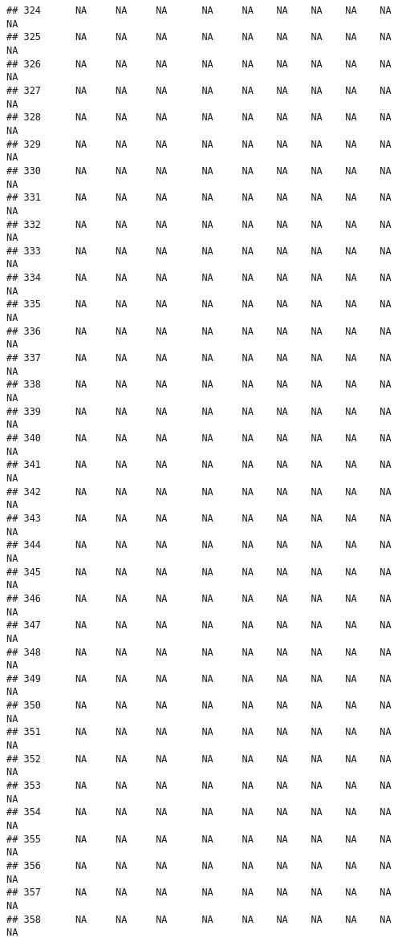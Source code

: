 \documentclass{article}\usepackage{graphicx, color}
\makeatletter
\newenvironment{kframe}{%
 \def\at@end@of@kframe{}%
 \ifinner\ifhmode%
  \def\at@end@of@kframe{\end{minipage}}%
  \begin{minipage}{\columnwidth}%
 \fi\fi%
 \def\FrameCommand##1{\hskip\@totalleftmargin \hskip-\fboxsep
 \colorbox{shadecolor}{##1}\hskip-\fboxsep
     \hskip-\linewidth \hskip-\@totalleftmargin \hskip\columnwidth}%
 \MakeFramed {\advance\hsize-\width
   \@totalleftmargin\z@ \linewidth\hsize
   \@setminipage}}%
 {\par\unskip\endMakeFramed%
 \at@end@of@kframe}
\newenvironment{knitrout}{}{} %
\makeatother
\begin{document}
\begin{knitrout}
\begin{kframe}
\begin{verbatim}
## 324      NA     NA     NA      NA     NA    NA    NA    NA    NA     NA
## 325      NA     NA     NA      NA     NA    NA    NA    NA    NA     NA
## 326      NA     NA     NA      NA     NA    NA    NA    NA    NA     NA
## 327      NA     NA     NA      NA     NA    NA    NA    NA    NA     NA
## 328      NA     NA     NA      NA     NA    NA    NA    NA    NA     NA
## 329      NA     NA     NA      NA     NA    NA    NA    NA    NA     NA
## 330      NA     NA     NA      NA     NA    NA    NA    NA    NA     NA
## 331      NA     NA     NA      NA     NA    NA    NA    NA    NA     NA
## 332      NA     NA     NA      NA     NA    NA    NA    NA    NA     NA
## 333      NA     NA     NA      NA     NA    NA    NA    NA    NA     NA
## 334      NA     NA     NA      NA     NA    NA    NA    NA    NA     NA
## 335      NA     NA     NA      NA     NA    NA    NA    NA    NA     NA
## 336      NA     NA     NA      NA     NA    NA    NA    NA    NA     NA
## 337      NA     NA     NA      NA     NA    NA    NA    NA    NA     NA
## 338      NA     NA     NA      NA     NA    NA    NA    NA    NA     NA
## 339      NA     NA     NA      NA     NA    NA    NA    NA    NA     NA
## 340      NA     NA     NA      NA     NA    NA    NA    NA    NA     NA
## 341      NA     NA     NA      NA     NA    NA    NA    NA    NA     NA
## 342      NA     NA     NA      NA     NA    NA    NA    NA    NA     NA
## 343      NA     NA     NA      NA     NA    NA    NA    NA    NA     NA
## 344      NA     NA     NA      NA     NA    NA    NA    NA    NA     NA
## 345      NA     NA     NA      NA     NA    NA    NA    NA    NA     NA
## 346      NA     NA     NA      NA     NA    NA    NA    NA    NA     NA
## 347      NA     NA     NA      NA     NA    NA    NA    NA    NA     NA
## 348      NA     NA     NA      NA     NA    NA    NA    NA    NA     NA
## 349      NA     NA     NA      NA     NA    NA    NA    NA    NA     NA
## 350      NA     NA     NA      NA     NA    NA    NA    NA    NA     NA
## 351      NA     NA     NA      NA     NA    NA    NA    NA    NA     NA
## 352      NA     NA     NA      NA     NA    NA    NA    NA    NA     NA
## 353      NA     NA     NA      NA     NA    NA    NA    NA    NA     NA
## 354      NA     NA     NA      NA     NA    NA    NA    NA    NA     NA
## 355      NA     NA     NA      NA     NA    NA    NA    NA    NA     NA
## 356      NA     NA     NA      NA     NA    NA    NA    NA    NA     NA
## 357      NA     NA     NA      NA     NA    NA    NA    NA    NA     NA
## 358      NA     NA     NA      NA     NA    NA    NA    NA    NA     NA

\end{verbatim}
\end{kframe}
\end{knitrout}
\end{document}
